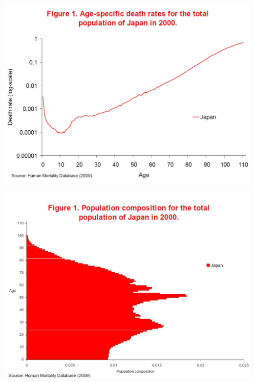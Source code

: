 \documentclass[xcolor={dvipsnames}]{beamer}
\begin{document}
\begin{frame}
\begin{center}
\includegraphics[scale=.3]{Figures/VCR1}
\end{center}
\end{frame}


\begin{frame}
\begin{center}
\includegraphics[scale=.3]{Figures/VCR2}
\end{center}
\end{frame}
\end{document}
